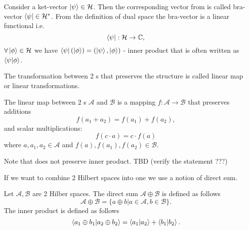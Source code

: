 \begin{example}
\label{ex:dirac_notation}
Consider a ket-vector $\ket{\psi} \in \mathcal{H}$. Then the
corresponding vector from  is called
bra-vector $\bra{\psi} \in \mathcal{H}^\ast$. From the definition of
dual space the bra-vector is a linear functional i.e. 
\[
\bra{\psi} : \mathcal{H} \to \mathbb{C},
\]
$\forall \ket{\phi} \in \mathcal{H}$ we have 
\(
\bra{\psi}\left(\ket{\phi}\right) = \left(\ket{\psi}, \ket{\phi}\right)
\) - inner product that is often written as $\bra{\psi}\ket{\phi}$.
\end{example}


The
transformation between 2 s that preserves
the structure is called 
linear map or linear transformations.
\begin{definition}
\label{def:linear_map}
The linear map between 2 s $\mathcal{A}$
and $\mathcal{B}$ is a mapping $f: \mathcal{A} \to \mathcal{B}$ that
preserves additions  
\[
f(a_1 + a_2) = f(a_1) + f(a_2),
\]
and scalar multiplications:
\[
f(c \cdot a) = c \cdot f(a)
\]
where $a,a_1,a_2 \in \mathcal{A}$ and $f(a), f(a_1), f(a_2) \in \mathcal{B}$.
\end{definition}

\begin{remark}
\label{rem:linear_map} 
Note that  does not preserve inner product.
TBD (verify the statement ???)
\end{remark}

If we want to combine 2 Hilbert spaces into one we use a notion of
direct sum.
\begin{definition}
  \label{def:fdhilb_direct_sum}
  Let $\mathcal{A}, \mathcal{B}$ are 2 Hilber spaces. The
  direct sum $\mathcal{A} \oplus \mathcal{B}$ is defined as follows
  \[
  \mathcal{A} \oplus \mathcal{B} = \{a \oplus b | a \in \mathcal{A}, b
  \in \mathcal{B}\}.
  \]
  The inner product is defined as follows
  \[
  \bra{a_1 \oplus b_1}\ket{a_2 \oplus b_2} =
  \bra{a_1}\ket{a_2} + \bra{b_1}\ket{b_2}.
  \]
\end{definition}

